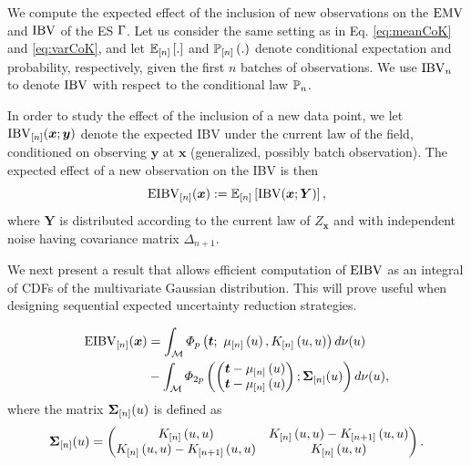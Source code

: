 \documentclass[aoas]{imsart}
\begin{document}
We compute the expected effect of the inclusion of new observations on
the $\operatorname{EMV}$ and $\operatorname{IBV}$ of the ES $\Gamma$. Let us consider the
same setting as in Eq. \eqref{eq:meanCoK} and \eqref{eq:varCoK}, and
let $\mathbb{E}_{[n]} \left[.\right]$ and $\mathbb{P}_{[n]} \left(.\right)$ denote conditional
expectation and probability, respectively, given the first $n$ batches of observations. We use $\operatorname{IBV}_{n}$ to denote $\operatorname{IBV}$ with respect to the conditional law $\mathbb{P}_{n}$.

\medskip

In order to study the effect of the inclusion of a new data point, we
let $ \operatorname{IBV}_{[n]}(\bm{x}; \bm{y}) $ denote the expected IBV under the
current law of the field, conditioned on observing $\bm{y}$ at $\bm{x}$
(generalized, possibly batch observation). The expected effect of a
new observation on the IBV is then 
\begin{equation}\label{def:eibv}
    \currentEIBV(\bm{x}):=\currentExp{\mbox{IBV}(\bm{x}; \bm{Y})},
\end{equation}
where $\bm{Y}$ is distributed according to the current law of
$Z_{\bm{x}}$ and with independent noise having covariance matrix
$\Delta_{n+1}$.

We next present a result that allows efficient computation of $\operatorname{EIBV}$
as an integral of CDFs of the multivariate Gaussian distribution. This will prove
useful when designing sequential expected uncertainty reduction strategies.

\begin{propo}
\label{propo_eibv}
\begin{equation}
\begin{split}
\currentEIBV(\bm{x})
&=\int_{\domain} \varPhi_{\no}\left(\bt;~\currentMean{\uu}, \currentCov{u, u}\right) d\mes(u)\\
&-\int_{\domain} \varPhi_{2\no}
\left(
\left(
\begin{matrix}
\bt-\currentMean{u}\\
\bt-\currentMean{u}
\end{matrix}
\right);
\mathbf{\Sigma}_{[n]}(\uu)
\right)
d\mes(u),
\end{split}
\end{equation}
where the matrix $\mathbf{\Sigma}_{[n]}(u)$ is defined as
\begin{equation*}
\begin{split}
\mathbf{\Sigma}_{[n]}(\uu)&=
\left(
\begin{matrix}
\currentCov{u, u} & \currentCov{u, u}-\futureCov{u, u}\\
\currentCov{u, u}-\futureCov{u, u} & \currentCov{u, u}
\end{matrix}
\right).\\
\end{split}
\end{equation*}
\end{propo}
\end{document}
